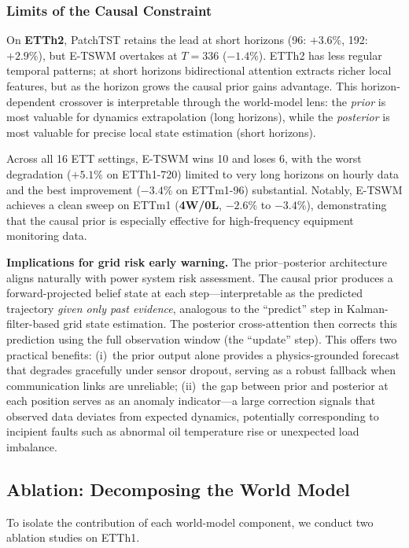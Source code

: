 \documentclass[conference]{IEEEtran}
\begin{document}
\subsubsection{Limits of the Causal Constraint}

On \textbf{ETTh2}, PatchTST retains the lead at short horizons (96: $+3.6\%$, 192: $+2.9\%$), but E-TSWM overtakes at $T{=}336$ ($-1.4\%$). ETTh2 has less regular temporal patterns; at short horizons bidirectional attention extracts richer local features, but as the horizon grows the causal prior gains advantage. This horizon-dependent crossover is interpretable through the world-model lens: the \emph{prior} is most valuable for dynamics extrapolation (long horizons), while the \emph{posterior} is most valuable for precise local state estimation (short horizons).

Across all 16 ETT settings, E-TSWM wins 10 and loses 6, with the worst degradation ($+5.1\%$ on ETTh1-720) limited to very long horizons on hourly data and the best improvement ($-3.4\%$ on ETTm1-96) substantial. Notably, E-TSWM achieves a clean sweep on ETTm1 (\textbf{4W/0L}, $-2.6\%$ to $-3.4\%$), demonstrating that the causal prior is especially effective for high-frequency equipment monitoring data.

\textbf{Implications for grid risk early warning.}
The prior--posterior architecture aligns naturally with power system risk assessment. The causal prior produces a forward-projected belief state at each step---interpretable as the predicted trajectory \emph{given only past evidence}, analogous to the ``predict'' step in Kalman-filter-based grid state estimation. The posterior cross-attention then corrects this prediction using the full observation window (the ``update'' step). This offers two practical benefits: (i)~the prior output alone provides a physics-grounded forecast that degrades gracefully under sensor dropout, serving as a robust fallback when communication links are unreliable; (ii)~the gap between prior and posterior at each position serves as an anomaly indicator---a large correction signals that observed data deviates from expected dynamics, potentially corresponding to incipient faults such as abnormal oil temperature rise or unexpected load imbalance.

\subsection{Ablation: Decomposing the World Model}

To isolate the contribution of each world-model component, we conduct two ablation studies on ETTh1.
\end{document}
